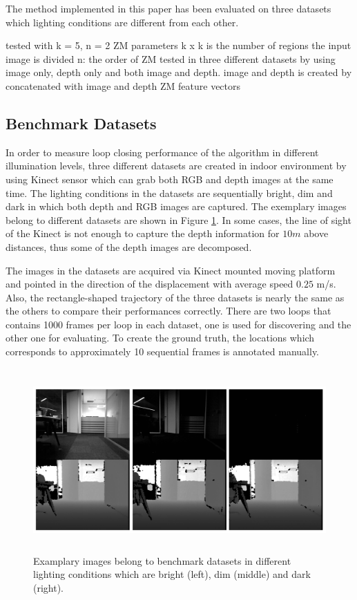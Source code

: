\documentclass[]{spie}  %
\begin{document}
The method implemented in this paper has been evaluated on three datasets which lighting conditions are different from each other. 

tested with k = 5, n = 2 ZM parameters
k x k is the number of regions the input image is divided
n: the order of ZM
tested in three different datasets by using image only, depth only and both image and depth.
image and depth is created by concatenated with image and depth ZM feature vectors


\subsection{Benchmark Datasets}

In order to measure loop closing performance of the algorithm in different illumination levels, three different datasets are created in indoor environment by using Kinect sensor which can grab both RGB and depth images at the same time. The lighting conditions in the datasets are sequentially bright, dim and dark in which both depth and RGB images are captured. The exemplary images belong to different datasets are shown in Figure \ref{fig:dataset}. In some cases, the line of sight of the Kinect is not enough to capture the depth information for $10m$ above distances, thus some of the depth images are decomposed.

The images in the datasets are acquired via Kinect mounted moving platform and pointed in the direction of the displacement with average speed $0.25$ m/s. Also, the rectangle-shaped trajectory of the three datasets is nearly the same as the others to compare their performances correctly. There are two loops that contains 1000 frames per loop in each dataset, one is used for discovering and the other one for evaluating. To create the ground truth, the locations which corresponds to approximately 10 sequential frames is annotated manually. 

\begin{figure}[!htb]
        \centering
        \includegraphics[trim = 0mm 0mm 0mm 0mm, clip, height=7cm]{figures/dataset_examples.png}
        \vspace{2mm}
        \caption{Examplary images belong to benchmark datasets in different lighting conditions which are bright (left), dim (middle) and dark (right).}
        \label{fig:dataset}
\end{figure}
\end{document}
